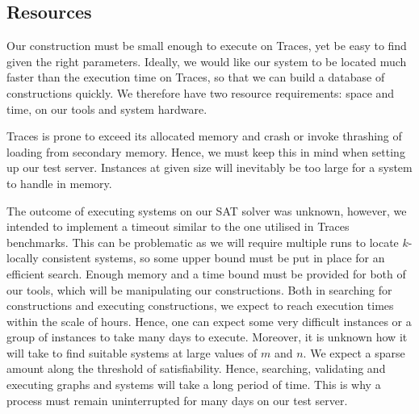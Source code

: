 \subsection{Resources}
Our construction must be small enough to execute on Traces, yet be easy to find given the right parameters. Ideally, we would like our system to be located much faster than the execution time on Traces, so that we can build a database of constructions quickly. We therefore have two resource requirements: space and time, on our tools and system hardware.
\par
Traces is prone to exceed its allocated memory and crash or invoke thrashing of loading from secondary memory. Hence, we must keep this in mind when setting up our test server. Instances at given size will inevitably be too large for a system to handle in memory. 
\par
The outcome of executing systems on our SAT solver was unknown, however, we intended to implement a timeout similar to the one utilised in Traces benchmarks. This can be problematic as we will require multiple runs to locate $k$-locally consistent systems, so some upper bound must be put in place for an efficient search. Enough memory and a time bound must be provided for both of our tools, which will be manipulating our constructions. Both in searching for constructions and executing constructions, we expect to reach execution times within the scale of hours. Hence, one can expect some very difficult instances or a group of instances to take many days to execute. Moreover, it is unknown how it will take to find suitable systems at large values of $m$ and $n$. We expect a sparse amount along the threshold of satisfiability. Hence, searching, validating and executing graphs and systems will take a long period of time. This is why a process must remain uninterrupted for many days on our test server. 





